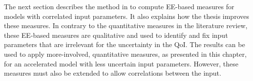 \documentclass[a4paper,12pt]{article}
\begin{document}
\newline
The next section describes the method in \cite{ge2014efficient} to compute EE-based measures for models with correlated input parameters. It also explains how the thesis improves these measures. In contrary to the quantitative measures in the literature review, these EE-based measures are qualitative and used to identify and fix input parameters that are irrelevant for the uncertainty in the QoI. The results can be used to apply more-involved, quantitative measures, as presented in this chapter, for an accelerated model with less uncertain input parameters. However, these measures must also be extended to allow correlations between the input.


	
\newpage

	
\end{document}

